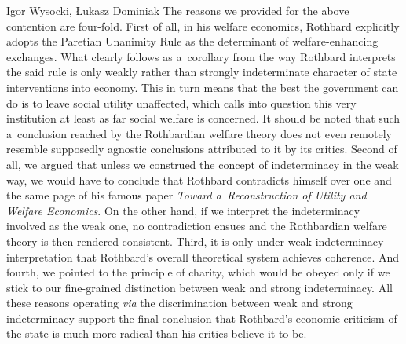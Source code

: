 \begin{artengenv}{Igor Wysocki, Łukasz Dominiak}
The reasons we provided for the above contention are four-fold. First of all, in his welfare economics, Rothbard explicitly adopts the Paretian Unanimity Rule as the determinant of welfare-enhancing exchanges. What clearly follows as a~corollary from the way Rothbard interprets the said rule is only weakly rather than strongly indeterminate character of state interventions into economy. This in turn means that the best the government can do is to leave social utility unaffected, which calls into question this very institution at least as far social welfare is concerned. It should be noted that such a~conclusion reached by the Rothbardian welfare theory does not even remotely resemble supposedly agnostic conclusions attributed to it by its critics. Second of all, we argued that unless we construed the concept of indeterminacy in the weak way, we would have to conclude that Rothbard contradicts himself over one and the same page of his famous paper \textit{Toward a~Reconstruction of Utility and Welfare Economics}. On the other hand, if we interpret the indeterminacy involved as the weak one, no contradiction ensues and the Rothbardian welfare theory is then rendered consistent. Third, it is only under weak indeterminacy interpretation that Rothbard's overall theoretical system achieves coherence. And fourth, we pointed to the principle of charity, which would be obeyed only if we stick to our fine-grained distinction between weak and strong indeterminacy. All these reasons operating \textit{via} the discrimination between weak and strong indeterminacy support the final conclusion that Rothbard's economic criticism of the state is much more radical than his critics believe it to be.





\end{artengenv}

\label{wysocki-last}
